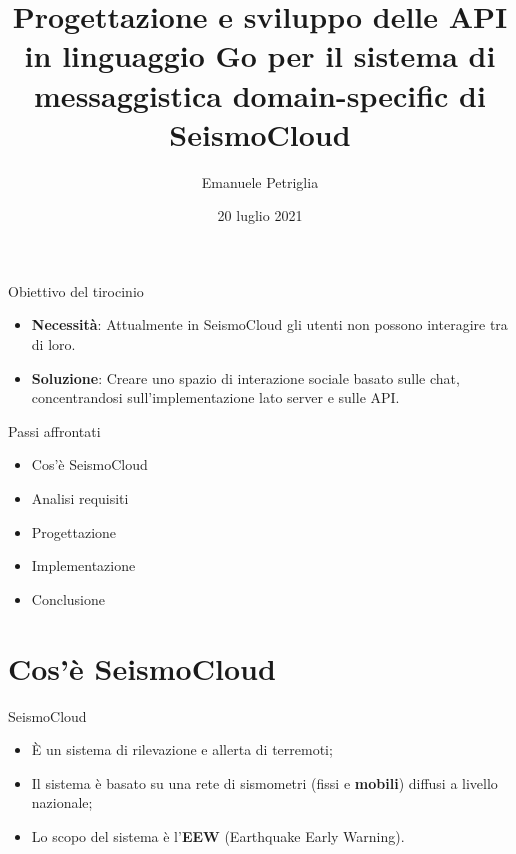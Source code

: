 \documentclass[compress]{beamer}
\title{Progettazione e sviluppo delle API in linguaggio Go per il sistema di messaggistica domain-specific di SeismoCloud}
\author{Emanuele Petriglia}
\institute{Dipartimento di Informatica\\Università La Sapienza - Roma}
\date{20 luglio 2021}
\begin{document}
\begin{frame}[t,plain]
\titlepage
\end{frame}

\begin{frame}[c]{Obiettivo del tirocinio}
\begin{itemize}
\item \textbf{Necessità}: Attualmente in SeismoCloud gli utenti non possono interagire tra di loro.
\vspace{1em}
\item \textbf{Soluzione}: Creare uno spazio di interazione sociale basato sulle chat, concentrandosi sull'implementazione lato server e sulle API.
\end{itemize}
\end{frame}

\begin{frame}[c]{Passi affrontati}
\begin{itemize}
\item Cos'è SeismoCloud
\item Analisi requisiti
\item Progettazione
\item Implementazione
\item Conclusione
\end{itemize}

\end{frame}

\section{Cos'è SeismoCloud}

\begin{frame}[c]{SeismoCloud}
\begin{itemize}
\item È un sistema di rilevazione e allerta di terremoti;
\vspace{1em}
\item Il sistema è basato su una rete di sismometri (fissi e \textbf{mobili}) diffusi a livello nazionale;
\vspace{1em}
\item Lo scopo del sistema è l'\textbf{EEW} (Earthquake Early Warning).
\end{itemize}
\end{frame}
\end{document}
